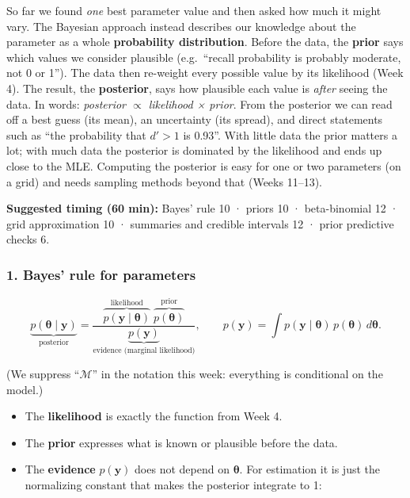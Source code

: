 So far we found \emph{one} best parameter value and then asked how much
it might vary. The Bayesian approach instead describes our knowledge
about the parameter as a whole \textbf{probability distribution}. Before
the data, the \textbf{prior} says which values we consider plausible
(e.g.~``recall probability is probably moderate, not 0 or 1''). The data
then re-weight every possible value by its likelihood (Week 4). The
result, the \textbf{posterior}, says how plausible each value is
\emph{after} seeing the data. In words: \emph{posterior \ensuremath{\propto} likelihood ×
prior}. From the posterior we can read off a best guess (its mean), an
uncertainty (its spread), and direct statements such as ``the
probability that \(d' > 1\) is 0.93''. With little data the prior
matters a lot; with much data the posterior is dominated by the
likelihood and ends up close to the MLE. Computing the posterior is easy
for one or two parameters (on a grid) and needs sampling methods beyond
that (Weeks 11--13).

\textbf{Suggested timing (60 min):} Bayes' rule 10 · priors 10 ·
beta-binomial 12 · grid approximation 10 · summaries and credible
intervals 12 · prior predictive checks 6.

\subsubsection{1. Bayes' rule for parameters}

\[
\underbrace{p(\boldsymbol\theta \mid \mathbf{y})}_{\text{posterior}}
= \frac{\overbrace{p(\mathbf{y} \mid \boldsymbol\theta)}^{\text{likelihood}}\;\overbrace{p(\boldsymbol\theta)}^{\text{prior}}}{\underbrace{p(\mathbf{y})}_{\text{evidence (marginal likelihood)}}},
\qquad
p(\mathbf{y}) = \int p(\mathbf{y}\mid\boldsymbol\theta)\,p(\boldsymbol\theta)\,d\boldsymbol\theta.
\]

(We suppress ``\(\mathcal{M}\)'' in the notation this week: everything
is conditional on the model.)

\begin{itemize}
\tightlist
\item
  The \textbf{likelihood} is exactly the function from Week 4.
\item
  The \textbf{prior} expresses what is known or plausible before the
  data.
\item
  The \textbf{evidence} \(p(\mathbf{y})\) does not depend on
  \(\boldsymbol\theta\). For estimation it is just the normalizing
  constant that makes the posterior integrate to 1:
\end{itemize}

